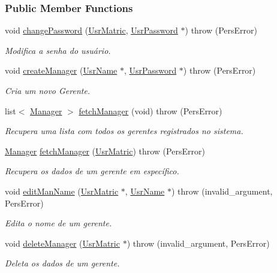 \subsubsection*{Public Member Functions}
\begin{DoxyCompactItemize}
\item 
void \hyperlink{classCtrlUserManAdm_a90fe4e0ab40e70992e28b0f56bcd76ac}{change\-Password} (\hyperlink{classUsrMatric}{Usr\-Matric}, \hyperlink{classUsrPassword}{Usr\-Password} $\ast$)  throw (\-Pers\-Error)
\begin{DoxyCompactList}\small\item\em Modifica a senha do usuário. \end{DoxyCompactList}\item 
void \hyperlink{classCtrlUserManAdm_ade392e40cc2b451590ef12b2af83674a}{create\-Manager} (\hyperlink{classUsrName}{Usr\-Name} $\ast$, \hyperlink{classUsrPassword}{Usr\-Password} $\ast$)  throw (\-Pers\-Error)
\begin{DoxyCompactList}\small\item\em Cria um novo Gerente. \end{DoxyCompactList}\item 
list$<$ \hyperlink{classManager}{Manager} $>$ \hyperlink{classCtrlUserManAdm_a65dc2eb59bff96b49f6b3bb06ee52fba}{fetch\-Manager} (void)  throw (\-Pers\-Error)
\begin{DoxyCompactList}\small\item\em Recupera uma lista com todos os gerentes registrados no sistema. \end{DoxyCompactList}\item 
\hyperlink{classManager}{Manager} \hyperlink{classCtrlUserManAdm_a45eba11162e5e9090575a8189184bb74}{fetch\-Manager} (\hyperlink{classUsrMatric}{Usr\-Matric})  throw (\-Pers\-Error)
\begin{DoxyCompactList}\small\item\em Recupera os dados de um gerente em específico. \end{DoxyCompactList}\item 
void \hyperlink{classCtrlUserManAdm_a114bc87d024079d6670f8880bd41c908}{edit\-Man\-Name} (\hyperlink{classUsrMatric}{Usr\-Matric} $\ast$, \hyperlink{classUsrName}{Usr\-Name} $\ast$)  throw (invalid\-\_\-argument, Pers\-Error)
\begin{DoxyCompactList}\small\item\em Edita o nome de um gerente. \end{DoxyCompactList}\item 
void \hyperlink{classCtrlUserManAdm_ab8a2c5188f0f90de9bf86d0e50a726e5}{delete\-Manager} (\hyperlink{classUsrMatric}{Usr\-Matric} $\ast$)  throw (invalid\-\_\-argument, Pers\-Error)
\begin{DoxyCompactList}\small\item\em Deleta os dados de um gerente. \end{DoxyCompactList}\end{DoxyCompactItemize}


